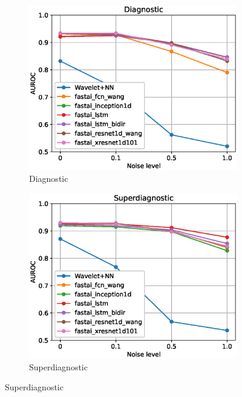 \begin{figure}[hp]
     \centering
     \begin{subfigure}[b]{0.45\textwidth}
        \includegraphics[width=1.0\textwidth]{images/noise_diagnostic.eps}
        \caption{Diagnostic}
        \label{fig:gridsearch_diag}
     \end{subfigure}
     \hfill
     \begin{subfigure}[b]{0.45\textwidth}
        \includegraphics[width=1.0\textwidth]{images/noise_superdiagnostic.eps}
        \caption{Superdiagnostic}

\end{subfigure}
\end{figure}
